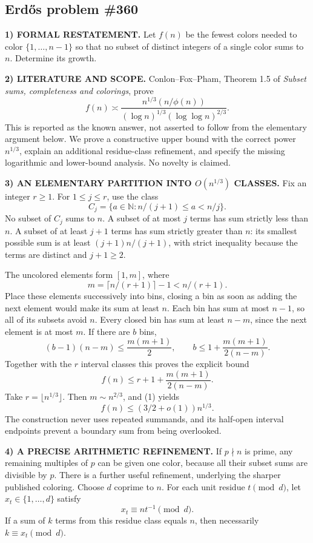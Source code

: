 \subsection*{Erd\H{o}s problem \#360}

\noindent\textbf{1) FORMAL RESTATEMENT.}
Let $f(n)$ be the fewest colors needed to color $\{1,\ldots,n-1\}$ so that no subset of distinct integers of a single color sums to $n$. Determine its growth.

\noindent\textbf{2) LITERATURE AND SCOPE.}
Conlon--Fox--Pham, Theorem 1.5 of \emph{Subset sums, completeness and colorings}, prove
\[
 f(n)\asymp
 \frac{n^{1/3}(n/\phi(n))}{(\log n)^{1/3}(\log\log n)^{2/3}}.
\]
This is reported as the known answer, not asserted to follow from the elementary argument below. We prove a constructive upper bound with the correct power $n^{1/3}$, explain an additional residue-class refinement, and specify the missing logarithmic and lower-bound analysis. No novelty is claimed.

\noindent\textbf{3) AN ELEMENTARY PARTITION INTO $O(n^{1/3})$ CLASSES.}
Fix an integer $r\ge1$. For $1\le j\le r$, use the class
\[
 C_j=\{a\in\mathbb N:n/(j+1)\le a<n/j\}.
\]
No subset of $C_j$ sums to $n$. A subset of at most $j$ terms has sum strictly less than $n$. A subset of at least $j+1$ terms has sum strictly greater than $n$: its smallest possible sum is at least $(j+1)n/(j+1)$, with strict inequality because the terms are distinct and $j+1\ge2$.

The uncolored elements form $[1,m]$, where
\[
 m=\lceil n/(r+1)\rceil-1<n/(r+1).
\]
Place these elements successively into bins, closing a bin as soon as adding the next element would make its sum at least $n$. Each bin has sum at most $n-1$, so all of its subsets avoid $n$. Every closed bin has sum at least $n-m$, since the next element is at most $m$. If there are $b$ bins,
\[
 (b-1)(n-m)\le\frac{m(m+1)}2,
 \qquad b\le1+\frac{m(m+1)}{2(n-m)}.
\]
Together with the $r$ interval classes this proves the explicit bound
\[
 f(n)\le r+1+\frac{m(m+1)}{2(n-m)}. \tag{1}
\]
Take $r=\lfloor n^{1/3}\rfloor$. Then $m\sim n^{2/3}$, and (1) yields
\[
 f(n)\le(3/2+o(1))n^{1/3}.
\]
The construction never uses repeated summands, and its half-open interval endpoints prevent a boundary sum from being overlooked.

\noindent\textbf{4) A PRECISE ARITHMETIC REFINEMENT.}
If $p\nmid n$ is prime, any remaining multiples of $p$ can be given one color, because all their subset sums are divisible by $p$. There is a further useful refinement, underlying the sharper published coloring. Choose $d$ coprime to $n$. For each unit residue $t\pmod d$, let $x_t\in\{1,\ldots,d\}$ satisfy
\[
 x_t\equiv nt^{-1}\pmod d.
\]
If a sum of $k$ terms from this residue class equals $n$, then necessarily $k\equiv x_t\pmod d$.


